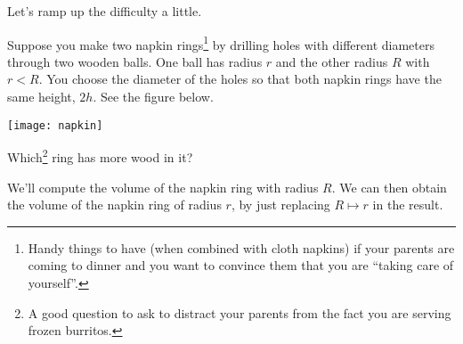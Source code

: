Let's ramp up the difficulty a little.
\begin{eg}\label{eg:VOLc}
Suppose you make two napkin rings\footnote{Handy things to have (when combined with cloth
napkins) if your parents are coming to dinner and you want to convince them that you are
``taking care of yourself''.} by drilling holes with different diameters through two
wooden balls. One ball has radius $r$ and the other radius $R$ with $r<R$. You
choose the diameter of the holes so that both napkin rings have the same
height, $2h$. See the
figure below.
\begin{efig}
\begin{center}
   \texttt{[image: napkin]}
\end{center}
\end{efig}
Which\footnote{A good question to ask to distract your parents from the fact you are
serving frozen burritos.} ring has more wood in it?

\soln We'll compute the volume of the napkin ring with radius $R$.
We can then obtain the volume of the napkin ring of radius $r$, by just replacing $R
\mapsto r$ in the result.


\end{eg}
